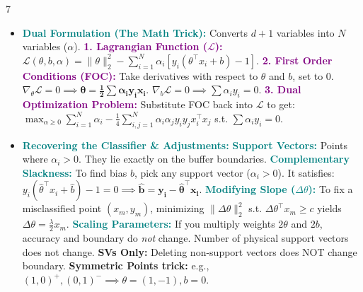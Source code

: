 \documentclass{article}
\newcommand{\concept}[1]{\textcolor{teal}{\textbf{#1}}}
\newcommand{\procname}[1]{\textcolor{purple}{\textbf{#1}}}
\newcommand{\lbl}[1]{\textcolor{green!60!black}{\textbf{#1}}}
\begin{document}
\begin{multicols}{7}
\begin{itemize}
    \item \concept{Dual Formulation (The Math Trick):} Converts $d+1$ variables into $N$ variables ($\alpha$). \procname{1. Lagrangian Function ($\mathcal{L}$):} $\mathcal{L}(\theta, b, \alpha) = \|\theta\|_2^2 - \sum_{i=1}^N \alpha_i [y_i(\theta^\top x_i + b) - 1]$. \procname{2. First Order Conditions (FOC):} Take derivatives with respect to $\theta$ and $b$, set to 0. $\nabla_\theta \mathcal{L} = 0 \implies \mathbf{\theta = \frac{1}{2}\sum \alpha_i y_i x_i}$. $\nabla_b \mathcal{L} = 0 \implies \sum \alpha_i y_i = 0$. \procname{3. Dual Optimization Problem:} Substitute FOC back into $\mathcal{L}$ to get: $\max_{\alpha \ge 0} \sum_{i=1}^N \alpha_i - \frac{1}{4} \sum_{i,j=1}^N \alpha_i \alpha_j y_i y_j x_i^\top x_j$ s.t. $\sum \alpha_i y_i = 0$.
    \item \concept{Recovering the Classifier \& Adjustments:} \concept{Support Vectors:} Points where $\alpha_i > 0$. They lie exactly on the buffer boundaries. \concept{Complementary Slackness:} To find bias $b$, pick any support vector ($\alpha_i > 0$). It satisfies: $y_i(\hat{\theta}^\top x_i + \hat{b}) - 1 = 0 \implies \mathbf{\hat{b} = y_i - \hat{\theta}^\top x_i}$. \concept{Modifying Slope ($\Delta \theta$):} To fix a misclassified point $(x_m, y_m)$, minimizing $\|\Delta\theta\|_2^2$ s.t. $\Delta\theta^\top x_m \ge c$ yields $\Delta\theta = \frac{\lambda}{2}x_m$. \concept{Scaling Parameters:} If you multiply weights $2\theta$ and $2b$, accuracy and boundary do \textit{not} change. Number of physical support vectors does not change. \lbl{SVs Only:} Deleting non-support vectors does NOT change boundary. \lbl{Symmetric Points trick:} e.g., $(1,0)^+, (0,1)^- \implies \theta=(1,-1), b=0$.
\end{itemize}


\end{multicols}
\end{document}
